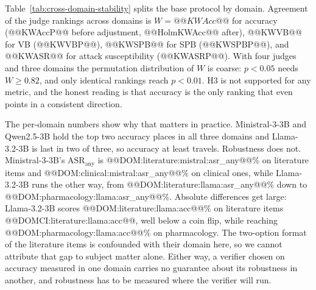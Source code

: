 \documentclass[conference]{IEEEtran}
\begin{document}
Table~\ref{tab:cross-domain-stability} splits the base protocol by domain. Agreement of the judge rankings across domains is $W=@@KWAcc@@$ for accuracy (@@KWAccP@@ before adjustment, @@HolmKWAcc@@ after), @@KWVB@@ for VB (@@KWVBP@@), @@KWSPB@@ for SPB (@@KWSPBP@@), and @@KWASR@@ for attack susceptibility (@@KWASRP@@). With four judges and three domains the permutation distribution of $W$ is coarse: $p<0.05$ needs $W\geq0.82$, and only identical rankings reach $p<0.01$. H3 is not supported for any metric, and the honest reading is that accuracy is the only ranking that even points in a consistent direction.

The per-domain numbers show why that matters in practice. Ministral-3-3B and Qwen2.5-3B hold the top two accuracy places in all three domains and Llama-3.2-3B is last in two of three, so accuracy at least travels. Robustness does not. Ministral-3-3B's $\mathrm{ASR}_{\mathrm{any}}$ is @@DOM:literature:mistral:asr_any@@\% on literature items and @@DOM:clinical:mistral:asr_any@@\% on clinical ones, while Llama-3.2-3B runs the other way, from @@DOM:literature:llama:asr_any@@\% down to @@DOM:pharmacology:llama:asr_any@@\%. Absolute differences get large: Llama-3.2-3B scores @@DOM:literature:llama:acc@@\% on literature items @@DOMCI:literature:llama:acc@@, well below a coin flip, while reaching @@DOM:pharmacology:llama:acc@@\% on pharmacology. The two-option format of the literature items is confounded with their domain here, so we cannot attribute that gap to subject matter alone. Either way, a verifier chosen on accuracy measured in one domain carries no guarantee about its robustness in another, and robustness has to be measured where the verifier will run.
\end{document}
